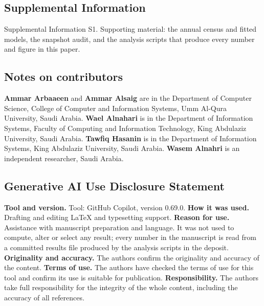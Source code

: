 \documentclass[fleqn,10pt,lineno]{wlpeerj}
\begin{document}
\subsection*{Supplemental Information}
\noindent Supplemental Information S1. Supporting material: the annual census and fitted models, the
snapshot audit, and the analysis scripts that produce every number and figure in this
paper.

\subsection*{Notes on contributors}
\noindent \textbf{Ammar Arbaaeen} and \textbf{Ammar Alsaig} are in the Department of Computer Science, College of Computer and Information Systems, Umm Al-Qura University, Saudi Arabia. \textbf{Wael Alnahari} is in the Department of Information Systems, Faculty of Computing and Information Technology, King Abdulaziz University, Saudi Arabia. \textbf{Tawfiq Hasanin} is in the Department of Information Systems, King Abdulaziz University, Saudi Arabia. \textbf{Wasem Alnahri} is an independent researcher, Saudi Arabia.

\subsection*{Generative AI Use Disclosure Statement}
\noindent \textbf{Tool and version.} Tool: GitHub Copilot, version 0.69.0. \textbf{How it was used.} Drafting and editing LaTeX and typesetting support. \textbf{Reason for use.} Assistance with manuscript preparation and language. It was not used to compute, alter or select any result; every number in the manuscript is read from a committed results file produced by the analysis scripts in the deposit. \textbf{Originality and accuracy.} The authors confirm the originality and accuracy of the content. \textbf{Terms of use.} The authors have checked the terms of use for this tool and confirm its use is suitable for publication. \textbf{Responsibility.} The authors take full responsibility for the integrity of the whole content, including the accuracy of all references.



\end{document}
